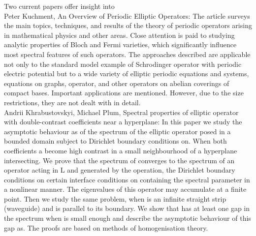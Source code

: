 Two current papers offer insight into 
~\\
Peter Kuchment, An Overview of Periodic Elliptic Operators: The article surveys the main topics, techniques, and results of the theory of periodic operators arising in mathematical physics and other areas. Close attention is paid to studying analytic properties of Bloch and Fermi varieties, which significantly influence most spectral features of such operators. The approaches described are applicable not only to the standard model example of Schrodinger operator with periodic electric potential but to a wide variety of elliptic periodic equations and systems, equations on graphs, operator, and other operators on abelian coverings of compact bases. Important applications are mentioned. However, due to the size restrictions, they are not dealt with in detail.
~\\
Andrii Khrabustovskyi, Michael Plum, Spectral properties of elliptic operator with double-contrast coefficients near a hyperplane: In this paper we study the asymptotic behaviour as of the spectrum of the elliptic operator posed in a bounded domain subject to Dirichlet boundary conditions on. When both coefficients a become high contrast in a small neighbourhood of a hyperplane intersecting. We prove that the spectrum of converges to the spectrum of an operator acting in L and generated by the operation, the Dirichlet boundary conditions on certain interface conditions on containing the spectral parameter in a nonlinear manner. The eigenvalues of this operator may accumulate at a finite point. Then we study the same problem, when is an infinite straight strip (waveguide) and is parallel to its boundary. We show that has at least one gap in the spectrum when is small enough and describe the asymptotic behaviour of this gap as. The proofs are based on methods of homogenisation theory.